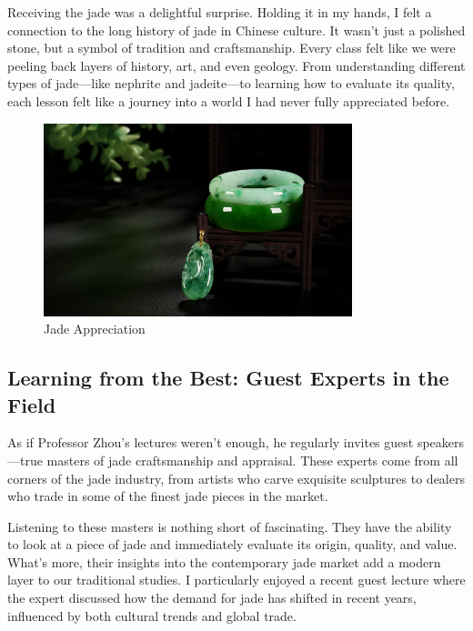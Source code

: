 \documentclass[a4paper]{article} 	%
\begin{document}
Receiving the jade was a delightful surprise. Holding it in my hands, I felt a connection to the long history of jade in Chinese culture. It wasn’t just a polished stone, but a symbol of tradition and craftsmanship. Every class felt like we were peeling back layers of history, art, and even geology. From understanding different types of jade—like nephrite and jadeite—to learning how to evaluate its quality, each lesson felt like a journey into a world I had never fully appreciated before.

\begin{figure}[h!]
	\centering
	\includegraphics[width=0.8\textwidth]{fig008.jpg}  %
	\caption{Jade Appreciation}
	\label{fig:008}
\end{figure}

\subsection*{Learning from the Best: Guest Experts in the Field}

As if Professor Zhou’s lectures weren’t enough, he regularly invites guest speakers—true masters of jade craftsmanship and appraisal. These experts come from all corners of the jade industry, from artists who carve exquisite sculptures to dealers who trade in some of the finest jade pieces in the market.

Listening to these masters is nothing short of fascinating. They have the ability to look at a piece of jade and immediately evaluate its origin, quality, and value. What’s more, their insights into the contemporary jade market add a modern layer to our traditional studies. I particularly enjoyed a recent guest lecture where the expert discussed how the demand for jade has shifted in recent years, influenced by both cultural trends and global trade.
\end{document}
